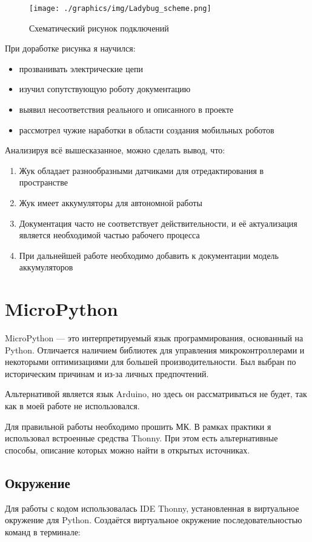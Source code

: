 \begin{figure}[!h]
    \texttt{[image: ./graphics/img/Ladybug\_scheme.png]}
    \caption{Схематический рисунок подключений}
    \label{f:lb_scheme}
\end{figure}

\pagebreak[3]
При доработке рисунка я научился:
\begin{itemize}
    \item прозванивать электрические цепи
    \item изучил сопутствующую роботу документацию
    \item выявил несоответствия реального и описанного в проекте
    \item рассмотрел чужие наработки в области создания мобильных роботов
\end{itemize}

Анализируя всё вышесказанное, можно сделать вывод, что:
\begin{enumerate}
    \item Жук обладает разнообразными датчиками для отредактирования в пространстве
    \item Жук имеет аккумуляторы для автономной работы
    \item Документация часто не соответствует действительности, и её актуализация является необходимой частью рабочего процесса
    \item При дальнейшей работе необходимо добавить к документации модель аккумуляторов
\end{enumerate}

\chapter{MicroPython}
MicroPython --- это интерпретируемый язык программирования, основанный на Python. Отличается наличием библиотек для управления микроконтроллерами и некоторыми оптимизациями для большей производительности. Был выбран по историческим причинам и из-за личных предпочтений.

Альтернативой является язык Arduino, но здесь он рассматриваться не будет, так как в моей работе не использовался.

Для правильной работы необходимо прошить МК. В рамках практики я использовал встроенные средства Thonny. При этом есть альтернативные способы, описание которых можно найти в открытых источниках.

\section{Окружение}
Для работы с кодом использовалась IDE Thonny, установленная в виртуальное окружение для Python. Создаётся виртуальное окружение последовательностью команд в терминале:

